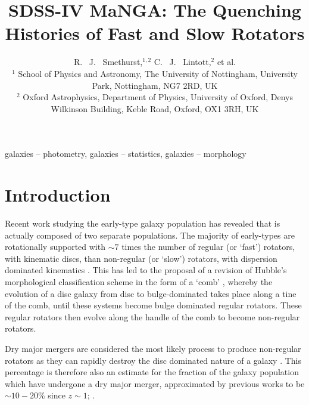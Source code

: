 \documentclass[useAMS,usenatbib]{mn2e}
\begin{document}
\title[Quenching Histories of Fast and Slow Rotators]{SDSS-IV MaNGA: The Quenching Histories of Fast and Slow Rotators}
\author[Smethurst et al. 2017]{R. ~J. ~Smethurst,$^{1,2}$ C. ~J. ~Lintott,$^{2}$ et al.
\\ $^1$ School of Physics and Astronomy, The University of Nottingham, University Park, Nottingham, NG7 2RD, UK
\\ $^2$ Oxford Astrophysics, Department of Physics, University of Oxford, Denys Wilkinson Building, Keble Road, Oxford, OX1 3RH, UK
}

\maketitle

\begin{abstract}
\end{abstract}

\begin{keywords}
galaxies -- photometry, galaxies -- statistics, galaxies -- morphology
\end{keywords}

\section{Introduction}\label{sec:intro}

Recent work studying the early-type galaxy population has revealed that is actually composed of two separate populations. The majority of early-types are rotationally supported \citep{emsellem11} with $\sim7$ times the number of regular (or `fast') rotators, with kinematic discs, than non-regular (or `slow') rotators, with dispersion dominated kinematics \citep{cappellari07, emsellem07}.  This has led to the proposal of a revision of Hubble's morphological classification scheme in the form of a `comb' \citep{cappellari16}, whereby the evolution of a disc galaxy from  disc to bulge-dominated takes place along a tine of the comb, until these systems become bulge dominated regular rotators. These regular rotators then evolve along the handle of the comb to become non-regular rotators. 

Dry major mergers are considered the most likely process to produce non-regular rotators \citep{duc11, naab14} as they can rapidly destroy the disc dominated nature of a galaxy \citep{toomre72}. This percentage is therefore also an estimate for the fraction of the galaxy population which have undergone a dry major merger, approximated by previous works to be $\sim10-20\%$ since $z\sim1$; \citep[][]{khochfar09}.
\end{document}
